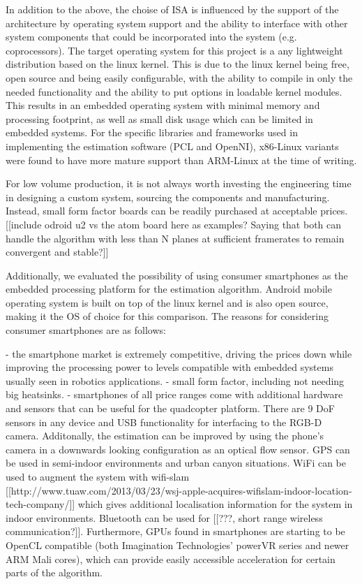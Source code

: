 \documentclass[]{article}
\begin{document}
{In addition to the above, the choise of ISA is influenced by the support of the architecture by operating system support and the ability to interface with other system components that could be incorporated into the system (e.g. coprocessors). The target operating system for this project is a any lightweight distribution based on the linux kernel. This is due to the linux kernel being free, open source and being easily configurable, with the ability to compile in only the needed functionality and the ability to put options in loadable kernel modules. This results in an embedded operating system with minimal memory and processing footprint, as well as small disk usage which can be limited in embedded systems. For the specific libraries and frameworks used in implementing the estimation software (PCL and OpenNI), x86-Linux variants were found to have more mature support than ARM-Linux at the time of writing.

For low volume production, it is not always worth investing the engineering time in designing a custom system, sourcing the components and manufacturing. Instead, small form factor boards can be readily purchased at acceptable prices. [[include odroid u2 vs the atom board here as examples? Saying that both can handle the algorithm with less than N planes at sufficient framerates to remain convergent and stable?]]

Additionally, we evaluated the possibility of using consumer smartphones as the embedded processing platform for the estimation algorithm. Android mobile operating system is built on top of the linux kernel and is also open source, making it the OS of choice for this comparison. The reasons for considering consumer smartphones are as follows:

- the smartphone market is extremely competitive, driving the prices down while improving the processing power to levels compatible with embedded systems usually seen in robotics applications.
- small form factor, including not needing big heatsinks.
- smartphones of all price ranges come with additional hardware and sensors that can be useful for the quadcopter platform. There are 9 DoF sensors in any device and USB functionality for interfacing to the RGB-D camera. Additonally, the estimation can be improved by using the phone's camera in a downwards looking configuration as an optical flow sensor. GPS can be used in semi-indoor environments and urban canyon situations. WiFi can be used to augment the system with wifi-slam [[http://www.tuaw.com/2013/03/23/wsj-apple-acquires-wifislam-indoor-location-tech-company/]] which gives additional localisation information for the system in indoor environments. Bluetooth can be used for [[???, short range wireless communication?]]. Furthermore, GPUs found in smartphones are starting to be OpenCL compatible (both Imagination Technologies' powerVR series and newer ARM Mali cores), which can provide easily accessible acceleration for certain parts of the algorithm.

}
\end{document}

